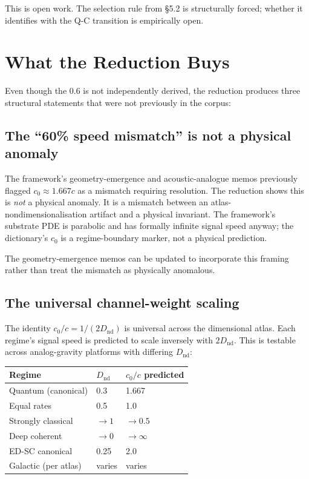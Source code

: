 \documentclass[11pt,a4paper]{article}
\begin{document}
This is open work. The selection rule from \S5.2 is structurally forced; whether it identifies with the Q-C transition is empirically open.

\section{What the Reduction Buys}

Even though the 0.6 is not independently derived, the reduction produces three structural statements that were not previously in the corpus:

\subsection{The ``60\% speed mismatch'' is not a physical anomaly}

The framework's geometry-emergence and acoustic-analogue memos previously flagged $c_0 \approx 1.667 c$ as a mismatch requiring resolution. The reduction shows this is \emph{not} a physical anomaly. It is a mismatch between an atlas-nondimensionalisation artifact and a physical invariant. The framework's substrate PDE is parabolic and has formally infinite signal speed anyway; the dictionary's $c_0$ is a regime-boundary marker, not a physical prediction.

The geometry-emergence memos can be updated to incorporate this framing rather than treat the mismatch as physically anomalous.

\subsection{The universal channel-weight scaling}

The identity $c_0/c = 1/(2 D_\mathrm{nd})$ is universal across the dimensional atlas. Each regime's signal speed is predicted to scale inversely with $2 D_\mathrm{nd}$. This is testable across analog-gravity platforms with differing $D_\mathrm{nd}$:

\begin{center}
\begin{tabular}{lll}
\toprule
\textbf{Regime} & $D_\mathrm{nd}$ & $c_0/c$ \textbf{predicted} \\
\midrule
Quantum (canonical) & 0.3 & 1.667 \\
Equal rates & 0.5 & 1.0 \\
Strongly classical & $\to 1$ & $\to 0.5$ \\
Deep coherent & $\to 0$ & $\to \infty$ \\
ED-SC canonical & 0.25 & 2.0 \\
Galactic (per atlas) & varies & varies \\
\bottomrule
\end{tabular}
\end{center}
\end{document}
